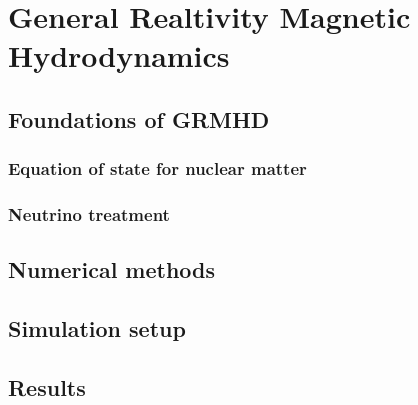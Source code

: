 

\chapter{General Realtivity Magnetic Hydrodynamics}

\section{Foundations of GRMHD}
\subsection{Equation of state for nuclear matter}
\subsection{Neutrino treatment}
\section{Numerical methods}
\section{Simulation setup}
\section{Results}






